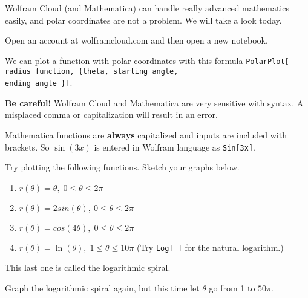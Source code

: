 \noindent Wolfram Cloud (and Mathematica) can handle really advanced mathematics easily, and polar coordinates are not a problem. We will take a look today.

\begin{exercise}
Open an account at wolframcloud.com and then open a new notebook.
\end{exercise}


\noindent We can plot a function with polar coordinates with this formula \lstinline$PolarPlot[ radius function, {theta, starting angle,$ \\ \lstinline$ending angle }]$.

\begin{remark}
\textbf{Be careful!} Wolfram Cloud and Mathematica are very sensitive with syntax. A misplaced comma or capitalization will result in an error. 
\end{remark}

\begin{remark}
Mathematica functions are \textbf{always} capitalized and inputs are included with brackets. So $\sin(3x)$ is entered in Wolfram language as \lstinline$Sin[3x]$.
\end{remark}

\newpage

\begin{exercise}
Try plotting the following functions. Sketch your graphs below.
\end{exercise}

\begin{enumerate}
    \item $r(\theta) = \theta, \; 0 \leq \theta \leq 2\pi$
    \vspace{2in}
    \item $r(\theta)=2sin(\theta), \:   0 \leq \theta \leq 2\pi$
    \vspace{2in}
    \item $r(\theta)= cos(4\theta), \; 0\leq \theta \leq 2\pi$
    \newpage
    \item $r(\theta) = \ln(\theta), \; 1 \leq \theta \leq 10\pi$ (Try \lstinline$Log[ ]$ for the natural logarithm.)
\end{enumerate}
\vspace{2in}

\noindent This last one is called the logarithmic spiral. 

\begin{exercise}
Graph the logarithmic spiral again, but this time let $\theta$ go from 1 to $50\pi$.
\end{exercise}

